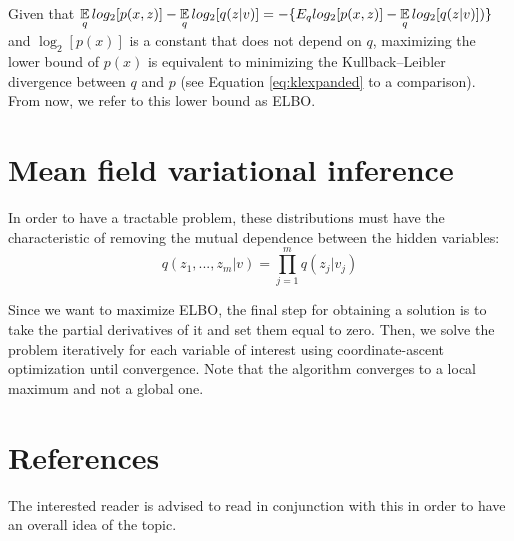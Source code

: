 Given that $ \displaystyle \operatorname*{\mathbb{E}}_q log_2[p(x,z)] - \operatorname*{\mathbb{E}}_q log_2[q(z | v)] = -\{E_q log_2[p(x,z)] - \operatorname*{\mathbb{E}}_q log_2[q(z | v)])\}$
and $\log_2[p(x)]$ is a constant that does not depend on $q$,
maximizing the lower bound of $p(x)$ is equivalent to minimizing the Kullback–Leibler divergence between $q$ and $p$ (see Equation \ref{eq:klexpanded} to a comparison).
From now, we refer to this lower bound as ELBO.

\section{Mean field variational inference}
In order to have a tractable problem, these distributions must have the characteristic
of removing the mutual dependence between the hidden variables:
$$ q(z_1, ..., z_m| v) = \prod_{j=1}^m q(z_j | v_j) $$

Since we want to maximize ELBO,
the final step for obtaining a solution is to take the partial derivatives of it and set them equal to zero.
Then, we solve the problem iteratively for each variable of interest using coordinate-ascent optimization until convergence.
Note that the algorithm converges to a local maximum and not a global one.

\section{References}
The interested reader is advised to read \cite{Blei_2017} in conjunction with this in order to have an overall idea of the topic.